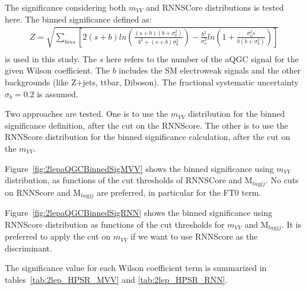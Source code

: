 The significance considering both $m_{VV}$ and RNNSCore distributions is tested here.
The binned significance defined as:
%
\begin{eqnarray*}
  Z = \sqrt{\sum_{bins}\left[2(s + b)ln\left(\frac{(s + b)(b+\sigma^2_{b})}{b^2+(s+b)\sigma^2_{b}}\right) - \frac{b^2}{\sigma^2_{b}}ln\left(1+\frac{\sigma^2_{b}s}{b(b+\sigma^2_{b})}\right)\right]} \\
\end{eqnarray*}
%
is used in this study.
The $s$ here refers to the number of the aQGC signal for the given Wilson coefficient.
The $b$ includes the SM electroweak signals and the other backgrounds (like Z+jets, ttbar, Diboson).
The fractional systematic uncertainty $\sigma_{b} = 0.2$ is assumed.

Two approaches are tested.
One is to use the $m_{VV}$ distribution for the binned significance definition, after the cut on the RNNScore.
The other is to use the RNNScore distribution for the binned significance calculation, after the cut on the $m_{VV}$.

Figure~\ref{fig:2lepaQGCBinnedSigMVV} shows the binned significance using $m_{VV}$ distribution,
as functions of the cut thresholds of RNNSCore and $\mathrm{M}_{tagjj}$.
No cuts on RNNScore and $\mathrm{M}_{tagjj}$ are preferred, in particular for the FT0 term.

Figure~\ref{fig:2lepaQGCBinnedSigRNN} shows the binned significance using RNNScore distribution
as functions of the cut thresholds for $m_{VV}$ and $\mathrm{M}_{tagjj}$.
It is preferred to apply the cut on $m_{VV}$ if we want to use RNNScore as the discriminant.

The significance value for each Wilson coefficient term is summarized in tables~\ref{tab:2lep_HPSR_MVV} and \ref{tab:2lep_HPSR_RNN}.

